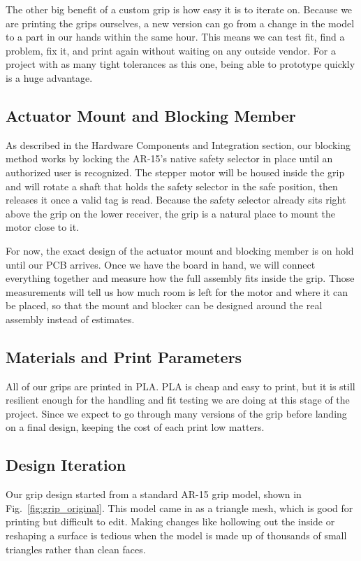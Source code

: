 The other big benefit of a custom grip is how easy it is to iterate on. Because we are
printing the grips ourselves, a new version can go from a change in the model to a part
in our hands within the same hour. This means we can test fit, find a problem, fix it,
and print again without waiting on any outside vendor. For a project with as many
tight tolerances as this one, being able to prototype quickly is a huge advantage.

\subsection{Actuator Mount and Blocking Member}
As described in the Hardware Components and Integration section, our blocking method
works by locking the AR-15's native safety selector in place until an authorized user is
recognized. The stepper motor will be housed inside the grip and will rotate a shaft that
holds the safety selector in the safe position, then releases it once a valid tag is read.
Because the safety selector already sits right above the grip on the lower receiver, the
grip is a natural place to mount the motor close to it.

For now, the exact design of the actuator mount and blocking member is on hold until our
PCB arrives. Once we have the board in hand, we will connect everything together and
measure how the full assembly fits inside the grip. Those measurements will tell us how
much room is left for the motor and where it can be placed, so that the mount and blocker
can be designed around the real assembly instead of estimates.

\subsection{Materials and Print Parameters}
All of our grips are printed in PLA. PLA is cheap and easy to print, but it is still
resilient enough for the handling and fit testing we are doing at this stage of the
project. Since we expect to go through many versions of the grip before landing on a
final design, keeping the cost of each print low matters.

\subsection{Design Iteration}
Our grip design started from a standard AR-15 grip model, shown in
Fig.~\ref{fig:grip_original}. This model came in as a triangle mesh, which is good for
printing but difficult to edit. Making changes like hollowing out the inside or
reshaping a surface is tedious when the model is made up of thousands of small
triangles rather than clean faces.

